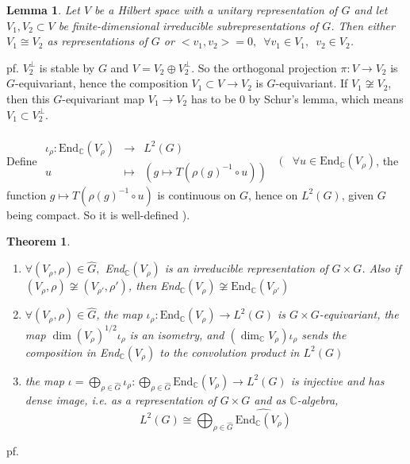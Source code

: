 \documentclass[12pt,letterpaper]{report}
\newtheorem{lemma}{Lemma}[section]
\newtheorem{theorem}{Theorem}[section]
\begin{document}
\begin{lemma}Let $V$ be a Hilbert space with a unitary representation of $G$ and let $V_{1},V_{2}\subset V$ be finite-dimensional irreducible subrepresentations of $G$. Then either $V_{1}\cong V_{2}$ as representations of $G$ or $<v_{1},v_{2}>=0,\,\,\,\forall v_{1}\in V_{1},\,\,\,v_{2}\in V_{2}$.\end{lemma}
pf. $V_{2}^{\perp}$ is stable by $G$ and $V= V_{2}\oplus V_{2}^{\perp}$. So the orthogonal projection $\pi:V\rightarrow V_{2}$ is $G$-equivariant, hence the composition $V_{1}\subset V\rightarrow V_{2}$ is $G$-equivariant. If $V_{1}\not\cong V_{2}$, then this $G$-equivariant map $V_{1}\rightarrow V_{2}$ has to be 0 by Schur's lemma, which means $V_{1}\subset V_{2}^{\perp}$. 
\\\\\indent Define $\begin{array}{rrr}\iota_{\rho}:\text{End}_{\mathbb{C}}(V_{\rho})&\rightarrow &L^{2}(G)\\u&\mapsto&(g\mapsto T(\rho(g)^{-1}\circ u))\end{array}\,\,\,\,(\,\,\,\,\,\forall u\in \text{End}_{\mathbb{C}}(V_{\rho})$, the function $g\mapsto T(\rho(g)^{-1}\circ u)$ is continuous on $G$, hence on $L^{2}(G)$, given $G$ being compact. So it is well-defined ).
\begin{theorem}\begin{enumerate}\item $\forall (V_{\rho},\rho)\in\hat{G},$ End$_{\mathbb{C}}(V_{\rho})$ is an irreducible representation of $G\times G$. Also if $(V_{\rho},\rho)\not\cong(V_{\rho'},\rho')$, then End$_{\mathbb{C}}(V_{\rho})\not\cong\text{End}_{\mathbb{C}}(V_{\rho'})$\item $\forall (V_{\rho},\rho)\in\hat{G}$, the map $\iota_{\rho}:\text{End}_{\mathbb{C}}(V_{\rho})\rightarrow L^{2}(G)$ is $G\times G$-equivariant, the map $\dim(V_{\rho})^{1/2}\iota_{\rho}$ is an isometry, and $(\dim_{\mathbb{C}}V_{\rho})\iota_{\rho}$ sends the composition in End$_{\mathbb{C}}(V_{\rho})$ to the convolution product in $L^{2}(G)$\item the map $\iota=\bigoplus_{\rho\in \hat{G}}\iota_{\rho}:\bigoplus_{\rho\in\hat{G}}\text{End}_{\mathbb{C}}(V_{\rho})\rightarrow L^{2}(G)$ is injective and has dense image, i.e. as a representation of $G\times G$ and as $\mathbb{C}$-algebra, \begin{equation*}L^{2}(G)\cong\bigoplus_{\rho\in\hat{G}}\widehat{\text{End}_{\mathbb{C}}(V_{\rho})}\end{equation*}\end{enumerate}\end{theorem}
pf. 
\end{document}
